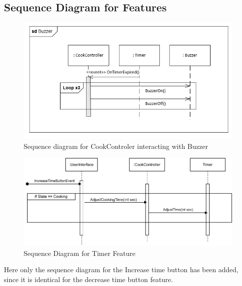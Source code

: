 \subsection{Sequence Diagram for Features}
\begin{figure}[h]
  \centering
  \includegraphics[scale=0.6]{02-Body/Image/BuzzerSEQ.PNG}
  \caption{Sequence diagram for CookControler interacting with Buzzer}%
  \label{fig:BuzzerSeq}
\end{figure}

\begin{figure}[h]
  \centering
  \includegraphics[scale=0.8]{02-Body/Image/TimerFeatureSEQ.pdf}
  \caption{Sequence Diagram for Timer Feature}%
  \label{fig:timeFeature}
\end{figure}

Here only the sequence diagram for the Increase time button has been added, since it
is identical for the decrease time button feature.

\newpage
